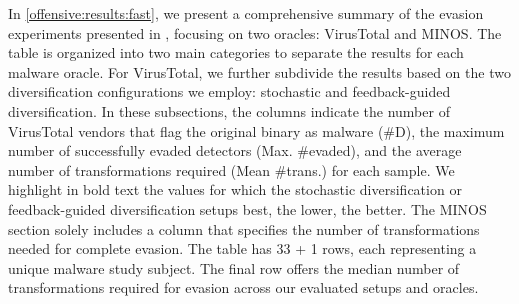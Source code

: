 In \autoref{offensive:results:fast}, we present a comprehensive summary of the evasion experiments presented in \cite{EVASION}, focusing on two oracles: VirusTotal and MINOS\cite{MINOS}. 
The table is organized into two main categories to separate the results for each malware oracle. 
For VirusTotal, we further subdivide the results based on the two diversification configurations we employ: stochastic and feedback-guided diversification. 
In these subsections, the columns indicate the number of VirusTotal vendors that flag the original binary as malware (\#D), the maximum number of successfully evaded detectors (Max. \#evaded), and the average number of transformations required (Mean \#trans.) for each sample. 
We highlight in bold text the values for which the stochastic diversification or feedback-guided diversification setups best, the lower, the better.
The MINOS section solely includes a column that specifies the number of transformations needed for complete evasion. 
The table has 33 + 1 rows, each representing a unique \Wasm malware study subject. 
The final row offers the median number of transformations required for evasion across our evaluated setups and oracles. 

